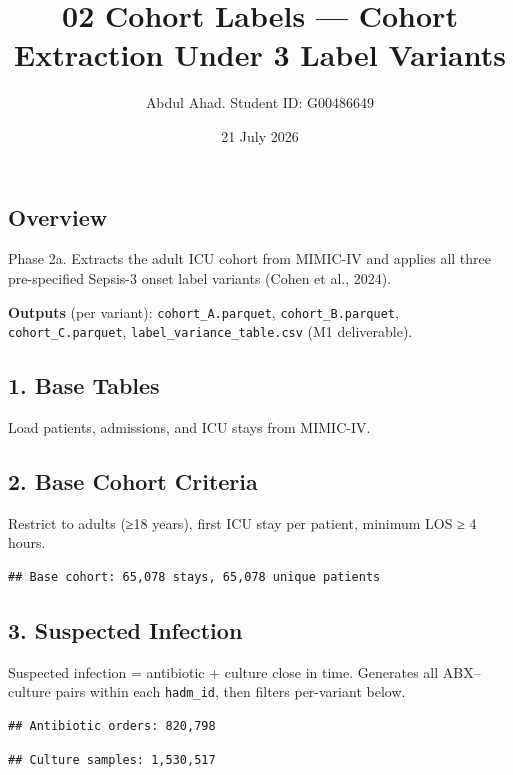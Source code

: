 \documentclass[
  11pt,
]{article}
\title{02 Cohort Labels --- Cohort Extraction Under 3 Label Variants}
\author{Abdul Ahad. Student ID: G00486649}
\date{21 July 2026}
\begin{document}
\maketitle

{
\setcounter{tocdepth}{3}
\tableofcontents
}
\subsection{Overview}\label{overview}

Phase 2a. Extracts the adult ICU cohort from MIMIC-IV and applies all three pre-specified Sepsis-3 onset label variants (Cohen et al., 2024).

\textbf{Outputs} (per variant): \texttt{cohort\_A.parquet}, \texttt{cohort\_B.parquet}, \texttt{cohort\_C.parquet}, \texttt{label\_variance\_table.csv} (M1 deliverable).

\subsection{1. Base Tables}\label{base-tables}

Load patients, admissions, and ICU stays from MIMIC-IV.

\subsection{2. Base Cohort Criteria}\label{base-cohort-criteria}

Restrict to adults (≥18 years), first ICU stay per patient, minimum LOS ≥ 4 hours.

\begin{verbatim}
## Base cohort: 65,078 stays, 65,078 unique patients
\end{verbatim}

\subsection{3. Suspected Infection}\label{suspected-infection}

Suspected infection = antibiotic + culture close in time. Generates all ABX--culture pairs within each \texttt{hadm\_id}, then filters per-variant below.

\begin{verbatim}
## Antibiotic orders: 820,798
\end{verbatim}

\begin{verbatim}
## Culture samples: 1,530,517
\end{verbatim}
\end{document}
